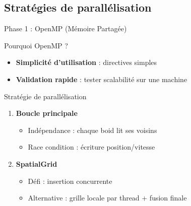 \documentclass[aspectratio=169]{beamer}
\begin{document}
\subsection{Stratégies de parallélisation}
\begin{frame}{Phase 1 : OpenMP (Mémoire Partagée)}
    \begin{block}{Pourquoi OpenMP ?}
        \begin{itemize}
            \item \textbf{Simplicité d'utilisation} : directives simples
            \item \textbf{Validation rapide} : tester scalabilité sur une machine
        \end{itemize}
    \end{block}

    \begin{block}{Stratégie de parallélisation}
        \begin{enumerate}
            \item \textbf{Boucle principale}
            \begin{itemize}
                \item Indépendance : chaque boid lit ses voisins
                \item Race condition : écriture position/vitesse 
            \end{itemize}
            \item \textbf{SpatialGrid}
            \begin{itemize}
                \item Défi : insertion concurrente
                \item Alternative : grille locale par thread  + fusion finale
            \end{itemize}
        \end{enumerate}
    \end{block}
\end{frame}
\end{document}
